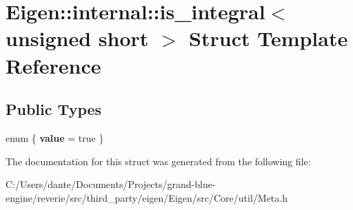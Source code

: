 \hypertarget{struct_eigen_1_1internal_1_1is__integral_3_01unsigned_01short_01_4}{}\section{Eigen\+::internal\+::is\+\_\+integral$<$ unsigned short $>$ Struct Template Reference}
\label{struct_eigen_1_1internal_1_1is__integral_3_01unsigned_01short_01_4}
\subsection*{Public Types}
\begin{DoxyCompactItemize}
\item 
\mbox{\label{struct_eigen_1_1internal_1_1is__integral_3_01unsigned_01short_01_4_a5b37eb8d12dc6e58817fdb00712dab99}} 
enum \{ {\bfseries value} = true
 \}
\end{DoxyCompactItemize}


The documentation for this struct was generated from the following file\+:\begin{DoxyCompactItemize}
\item 
C\+:/\+Users/dante/\+Documents/\+Projects/grand-\/blue-\/engine/reverie/src/third\+\_\+party/eigen/\+Eigen/src/\+Core/util/Meta.\+h\end{DoxyCompactItemize}
